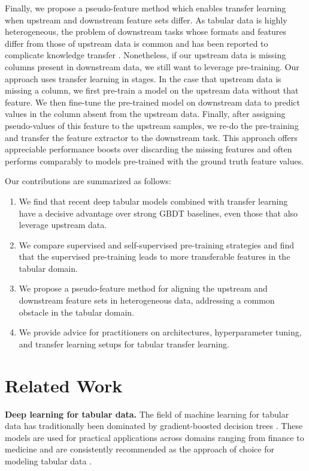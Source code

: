 Finally, we propose a pseudo-feature method which enables transfer learning when upstream and downstream feature sets differ. As tabular data is highly heterogeneous, the problem of downstream tasks whose formats and features differ from those of upstream data is common and has been reported to complicate knowledge transfer \citep{lewinson2020python}. Nonetheless, if our upstream data is missing columns present in downstream data, we still want to leverage pre-training.  Our approach uses transfer learning in stages. In the case that upstream data is missing a column, we first pre-train a model on the upstream data without that feature. We then fine-tune the pre-trained model on downstream data to predict values in the column absent from the upstream data.  Finally, after assigning pseudo-values of this feature to the upstream samples, we re-do the pre-training and transfer the feature extractor to the downstream task.  This approach offers appreciable performance boosts over discarding the missing features and often performs comparably to models pre-trained with the ground truth feature values.

Our contributions are summarized as follows:

\begin{enumerate}

\item We find that recent deep tabular models combined with transfer learning have a decisive advantage over strong GBDT baselines, even those that also leverage upstream data.
\item We compare supervised and self-supervised pre-training strategies and find that the supervised pre-training leads to more transferable features in the tabular domain.
\item We propose a pseudo-feature method for aligning the upstream and downstream feature sets in heterogeneous data, addressing a common obstacle in the tabular domain.
\item We provide advice for practitioners on architectures, hyperparameter tuning, and transfer learning setups for tabular transfer learning.

\end{enumerate}

\section{Related Work}
\label{sec:related-work}

{\bf Deep learning for tabular data.} The field of machine learning for tabular data has traditionally been dominated by gradient-boosted decision trees \citep{friedman2001greedy, chen2016xgboost, ke2017lightgbm, prokhorenkova2018catboost}. These models are used for practical applications across domains ranging from finance to medicine and are consistently recommended as the approach of choice for modeling tabular data \citep{SHWARTZZIV202284}. 

